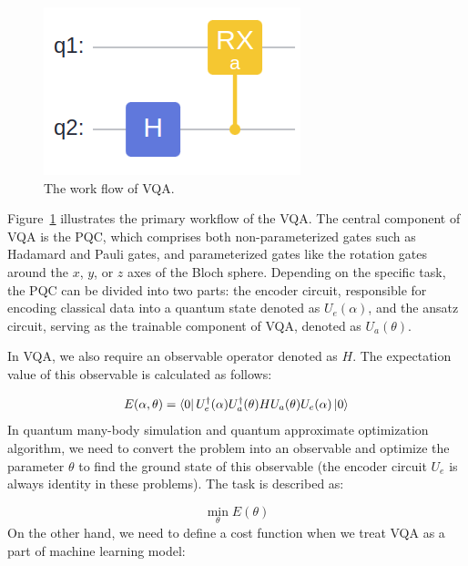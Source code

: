 \begin{figure}[h]
  \begin{center}
    \includegraphics[width=0.9\linewidth]{images/3_1_vqa.png}
  \end{center}
  \caption{The work flow of VQA.}
  \label{fig:vqa_work_flow}
\end{figure}

Figure~\ref{fig:vqa_work_flow} illustrates the primary workflow of the VQA. The central component of VQA is the PQC, which comprises both non-parameterized gates such as Hadamard and Pauli gates, and parameterized gates like the rotation gates around the $x$, $y$, or $z$ axes of the Bloch sphere. Depending on the specific task, the PQC can be divided into two parts: the encoder circuit, responsible for encoding classical data into a quantum state denoted as $U_e(\alpha)$, and the ansatz circuit, serving as the trainable component of VQA, denoted as $U_a(\theta)$.

In VQA, we also require an observable operator denoted as $H$. The expectation value of this observable is calculated as follows:

\begin{equation}
  E(\alpha, \theta) = \bra{0}U_e^\dagger(\alpha)U_a^\dagger(\theta)HU_a(\theta)U_e(\alpha)\ket{0}
\end{equation}
In quantum many-body simulation and quantum approximate optimization algorithm, we need to convert the problem into an observable and optimize the parameter $\theta$ to find the ground state of this observable (the encoder circuit $U_e$ is always identity in these problems). The task is described as:

\begin{equation}
  \min_\theta E(\theta)
\end{equation}
On the other hand, we need to define a cost function when we treat VQA as a part of machine learning model:

